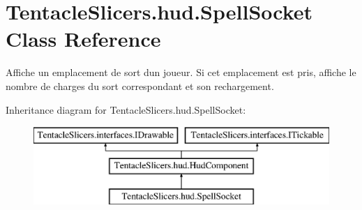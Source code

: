 \hypertarget{class_tentacle_slicers_1_1hud_1_1_spell_socket}{}\section{Tentacle\+Slicers.\+hud.\+Spell\+Socket Class Reference}
\label{class_tentacle_slicers_1_1hud_1_1_spell_socket}


Affiche un emplacement de sort d\textquotesingle{}un joueur. Si cet emplacement est pris, affiche le nombre de charges du sort correspondant et son rechargement.  


Inheritance diagram for Tentacle\+Slicers.\+hud.\+Spell\+Socket\+:\begin{figure}[H]
\begin{center}
\leavevmode
\includegraphics[height=3.000000cm]{class_tentacle_slicers_1_1hud_1_1_spell_socket}
\end{center}
\end{figure}
